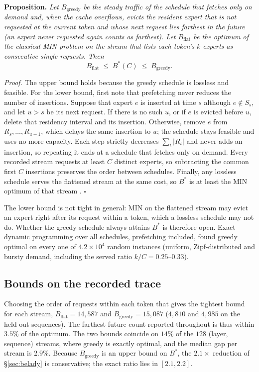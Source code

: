 \documentclass{article}
\begin{document}
\textbf{Proposition.} \emph{Let $B_{\mathrm{greedy}}$ be the steady traffic
of the schedule that fetches only on demand and, when the cache overflows,
evicts the resident expert that is not requested at the current token and
whose next request lies farthest in the future (an expert never requested
again counts as farthest). Let $B_{\mathrm{flat}}$ be the optimum of the
classical MIN problem on the stream that lists each token's $k$ experts as
consecutive single requests. Then}
\[
B_{\mathrm{flat}} \;\le\; B^*(C) \;\le\; B_{\mathrm{greedy}}.
\]

\emph{Proof.} The upper bound holds because the greedy schedule is lossless
and feasible. For the lower bound, first note that prefetching never reduces
the number of insertions. Suppose that expert $e$ is inserted at time $s$
although $e\notin S_s$, and let $u>s$ be its next request. If there is no such
$u$, or if $e$ is evicted before $u$, delete that residency interval and its
insertion. Otherwise, remove $e$ from $R_s,\ldots,R_{u-1}$, which delays the
same insertion to $u$; the schedule stays feasible and uses no more capacity.
Each step strictly decreases $\sum_t |R_t|$ and never adds an insertion, so
repeating it ends at a schedule that fetches only on demand. Every recorded
stream requests at least $C$ distinct experts, so subtracting the common
first $C$ insertions preserves the order between schedules. Finally, any
lossless schedule serves the flattened stream at the same cost, so $B^*$ is
at least the MIN optimum of that stream
\citep{belady1966study,mattson1970evaluation}. \hfill$\square$

The lower bound is not tight in general: MIN on the flattened stream may
evict an expert right after its request within a token, which a lossless
schedule may not do. Whether the greedy schedule always attains $B^*$ is
therefore open. Exact dynamic programming over all schedules, prefetching
included, found greedy optimal on every one of $4.2\times10^4$ random
instances (uniform, Zipf-distributed and bursty demand, including the served
ratio $k/C = 0.25$--$0.33$).

\subsection{Bounds on the recorded trace}
Choosing the order of requests
within each token that gives the tightest bound for each stream,
$B_{\mathrm{flat}} = 14{,}587$ and $B_{\mathrm{greedy}} = 15{,}087$ ($4{,}810$
and $4{,}985$ on the held-out sequences). The farthest-future count reported
throughout is thus within $3.5\%$ of the optimum. The two bounds coincide on
$14\%$ of the $128$ (layer, sequence) streams, where greedy is exactly
optimal, and the median gap per stream is $2.9\%$. Because
$B_{\mathrm{greedy}}$ is an upper bound on $B^*$, the $2.1\times$ reduction of
\S\ref{sec:belady} is conservative; the exact ratio lies in $[2.1, 2.2]$.
\end{document}
